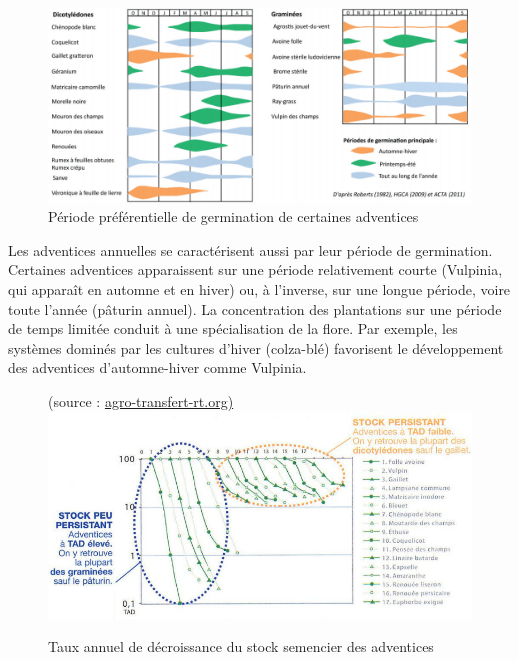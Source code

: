 \documentclass[../thesis.tex]{subfiles}
\begin{document}
    \begin{figure}[H]
        \centering
        \includegraphics[width=\linewidth]{img/intro/iwm-seedling-2}
        \caption{Période préférentielle de germination de certaines adventices}
        \label{fig:02-iwm-seedling}
    \end{figure}
    
    \newpage
    \par Les adventices annuelles se caractérisent aussi par leur période de germination. Certaines adventices apparaissent sur une période relativement courte (Vulpinia, qui apparaît en automne et en hiver) ou, à l'inverse, sur une longue période, voire toute l'année (pâturin annuel). La concentration des plantations sur une période de temps limitée conduit à une spécialisation de la flore. Par exemple, les systèmes dominés par les cultures d'hiver (colza-blé) favorisent le développement des adventices d'automne-hiver comme Vulpinia. \\
    
    \vfill
    \begin{figure}[H]
        \centering
        {\scriptsize (source : \href{http://www.agro-transfert-rt.org/wp-content/uploads/2016/02/Des_parcelles_plus_propres_avec_moins_dherbicides.pdf}{agro-transfert-rt.org)}} \\
        \includegraphics[width=\linewidth]{img/intro/iwm-stock}
        \caption{Taux annuel de décroissance du stock semencier des adventices}
        \label{fig:02-iwm-stock}
    \end{figure}
    \vfill
    
\end{document}

